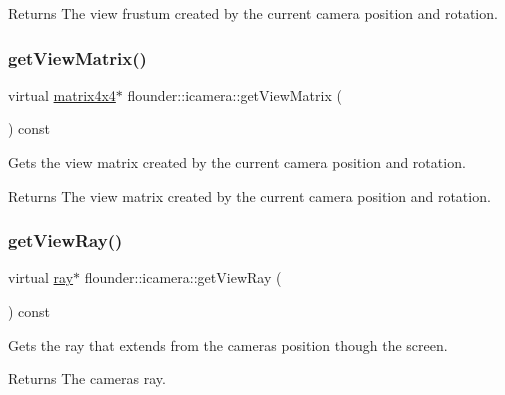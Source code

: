 \begin{DoxyReturn}{Returns}
The view frustum created by the current camera position and rotation. 
\end{DoxyReturn}
\mbox{\label{classflounder_1_1icamera_a95b93e33ce9d02b9ea23f7d7f9205d13}} 
\subsubsection{\texorpdfstring{get\+View\+Matrix()}{getViewMatrix()}}
{\footnotesize\ttfamily virtual \hyperlink{classflounder_1_1matrix4x4}{matrix4x4}$\ast$ flounder\+::icamera\+::get\+View\+Matrix (\begin{DoxyParamCaption}{ }\end{DoxyParamCaption}) const\hspace{0.3cm}{\ttfamily [pure virtual]}}



Gets the view matrix created by the current camera position and rotation. 

\begin{DoxyReturn}{Returns}
The view matrix created by the current camera position and rotation. 
\end{DoxyReturn}
\mbox{\label{classflounder_1_1icamera_ab2ff70f38f2e5a93223d3590b75a3b77}} 
\subsubsection{\texorpdfstring{get\+View\+Ray()}{getViewRay()}}
{\footnotesize\ttfamily virtual \hyperlink{classflounder_1_1ray}{ray}$\ast$ flounder\+::icamera\+::get\+View\+Ray (\begin{DoxyParamCaption}{ }\end{DoxyParamCaption}) const\hspace{0.3cm}{\ttfamily [pure virtual]}}



Gets the ray that extends from the cameras position though the screen. 

\begin{DoxyReturn}{Returns}
The cameras ray. 
\end{DoxyReturn}
\mbox{\label{classflounder_1_1icamera_a20ee0d37d318012ac51e132ed02af6da}} 
